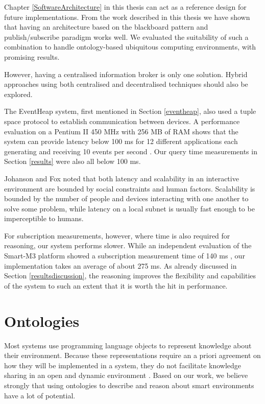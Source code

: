 Chapter \ref{SoftwareArchitecture} in this thesis can act as a reference design for future implementations. From the work described in this thesis we have shown that having an architecture based on the blackboard pattern and publish/subscribe paradigm works well. We evaluated the suitability of such a combination to handle on\-tol\-o\-gy-based ubiquitous computing environments, with promising results.%

However, having a centralised information broker is only one solution. Hybrid approaches using both centralised and decentralised techniques should also be explored.   

The EventHeap system, first mentioned in Section \ref{eventheap}, also used a tuple space protocol to establish communication between devices. A performance evaluation on a Pentium II 450 MHz with 256 MB of RAM shows that the system can provide latency below 100 ms for 12 different applications each generating and receiving 10 events per second \cite{Johanson2002}. Our query time measurements in Section 
\ref{results} were also all below 100 ms.

Johanson and Fox \cite{Johanson2002} noted that both latency and scalability in an interactive environment are bounded by social constraints and human factors. Scalability is bounded by the number of people and devices interacting with one another to solve some problem, while latency on a local subnet is usually fast enough to be imperceptible to humans.

For subscription measurements, however, where time is also required for reasoning, our system performs slower. While an independent evaluation of the Smart-M3 platform showed a subscription measurement time of 140 ms \cite{Etelapera2011}, our implementation takes an average of about 275 ms. As already discussed in Section \ref{resultsdiscussion}, the reasoning improves the flexibility and capabilities of the system to such an extent that it is worth the hit in performance.







\section{Ontologies}

Most systems use programming language objects to represent knowledge about their environment. Because these representations require an a priori agreement on how they will be implemented in a system, they do not facilitate knowledge sharing in an open and dynamic environment \cite{Chen2004}. Based on our work, we believe strongly that using ontologies to describe and reason about smart environments have a lot of potential.  
	
